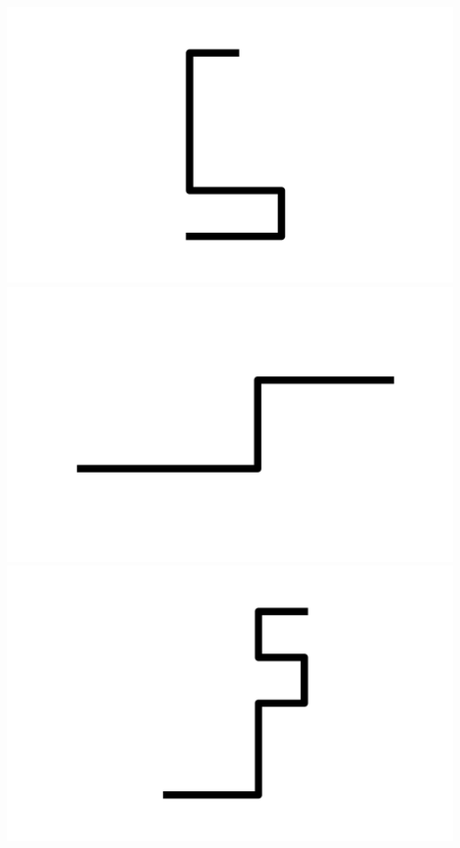 \documentclass[]{report}
\begin{document}
\includegraphics[scale=.1]{pictures/21/state_cluster_shapes_235.pdf} 
\includegraphics[scale=.1]{pictures/21/state_cluster_shapes_236.pdf} 
\includegraphics[scale=.1]{pictures/21/state_cluster_shapes_237.pdf} 
\end{document}
